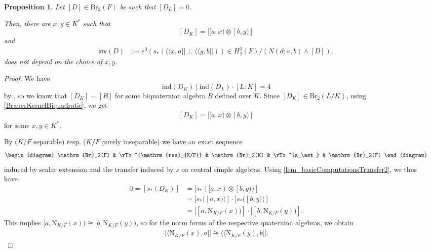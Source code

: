 \documentclass{amsart}
\newtheorem{proposition}[definition]{Proposition}
\numberwithin{equation}{section}
\newcommand{\qpf}[1]{\langle\!\langle #1]\!]}
\newcommand{\BrTwo}{\mathrm{Br}_2}
\newcommand{\ind}{\mathrm{ind}}
\newcommand{\quat}[1]{[#1)}
\newcommand{\norm}{\mathrm{N}}
\newcommand{\res}{\mathrm{res}}
\newcommand{\inv}{\mathsf{inv}}
\begin{document}
\begin{proposition} \label{prop_DK_ExistenceInv}
    Let $[D] \in \BrTwo(F)$ be such that $[D_L] = 0$.

    Then, there are $x, y \in K^\ast$ such that
    \[[D_K] = [\quat{a, x} \otimes \quat{b, y}]\]
    and 
    \begin{align*}
        \inv(D) &:= e^3(s_\ast(\qpf{x, a} \perp \qpf{y, b})) \in H_2^3(F) / (N(d; a, b) \wedge [D]),
    \end{align*}
    does not depend on the choice of $x, y$.
\end{proposition}
\begin{proof}
    We have 
    \[\ind(D_K)\mid \ind(D_L)\cdot [L:K] = 4\]
    by \cite[Corollary 4.5.11]{GilleSzamuely_CSAGalCohomology}, so we know that $[D_K] = [B]$ for some biquaternion algebra $B$ defined over $K$.
    Since $[D_K] \in \BrTwo(L/K)$, using \eqref{BrauerKernelBiquadratic}, we get
   \begin{align} \label{eq_D_KAlbertForm}
        [D_K] = [\quat{a, x} \otimes \quat{b, y}]
    \end{align}
    for some $x, y \in K^\ast$.

    By \cite[(6.4) Proposition]{MR1154404} ($K / F$ separable) resp. \cite[Theorem 4.2]{AravireLaghribiORyan_TransferInsep} ($K / F$ purely inseparable) we have an exact sequence
    \begin{align}\label{eq_ComplexExtTransfer}
        \begin{diagram}
            \BrTwo(F) & \rTo^{\res_{K/F}} & \BrTwo(K) & \rTo^{s_\ast} & \BrTwo(F)
        \end{diagram}
    \end{align}
    induced by scalar extension and the transfer induced by $s$ on central simple algebras.
    Using  \ref{lem_basicComputationsTransfer2}, we thus have
    \begin{align*}
        0 = [s_\ast(D_K)] &= [s_\ast(\quat{a, x} \otimes \quat{b, y})]\\
        &= [s_\ast(\quat{a, x})] \cdot [s_\ast(\quat{b, y})]\\
        &= [\quat{a, \norm_{K/F}(x)}] \cdot [\quat{b, \norm_{K/F}(y)}].
    \end{align*}
    This implies $\quat{a, \norm_{K/F}(x)} \cong \quat{b, \norm_{K/F}(y)}$, so for the norm forms of the respective quaternion algebras, we obtain
    \begin{align}\label{eq_EqualityOfPfisterforms}
        \qpf{\norm_{K/F}(x), a} \cong \qpf{\norm_{K/F}(y), b}.
    \end{align}


\end{proof}
\end{document}
